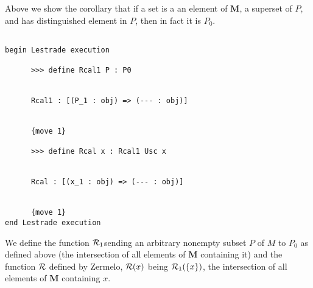 \documentclass[12pt]{article}
\begin{document}
Above we show the corollary that if a set is a an element of {\bf M}, a superset of $P$, and has distinguished element in $P$, then in fact it is $P_0$.

\begin{verbatim}

begin Lestrade execution

      >>> define Rcal1 P : P0


      Rcal1 : [(P_1 : obj) => (--- : obj)]


      {move 1}

      >>> define Rcal x : Rcal1 Usc x


      Rcal : [(x_1 : obj) => (--- : obj)]


      {move 1}
end Lestrade execution
\end{verbatim}

We define the function ${\cal R}_1$sending an arbitrary nonempty subset $P$ of $M$ to $P_0$ as defined above (the intersection of all elements of {\bf M} containing it)
and the function $\cal R$ defined by Zermelo, ${\cal R}(x)$ being ${\cal R}_1(\{x\})$, the intersection of all elements of {\bf M} containing $x$.
\end{document}
